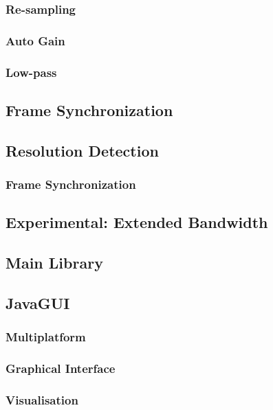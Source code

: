\documentclass[a4paper,12pt,twoside,openright]{report}
\begin{document}
\subsubsection{Re-sampling}

\subsubsection{Auto Gain}

\subsubsection{Low-pass}

\subsection{Frame Synchronization}

\subsection{Resolution Detection}

\subsubsection{Frame Synchronization}

\subsection{Experimental: Extended Bandwidth}

\subsection{Main Library}

\subsection{JavaGUI}

\subsubsection{Multiplatform}

\subsubsection{Graphical Interface}

\subsubsection{Visualisation}
\end{document}
